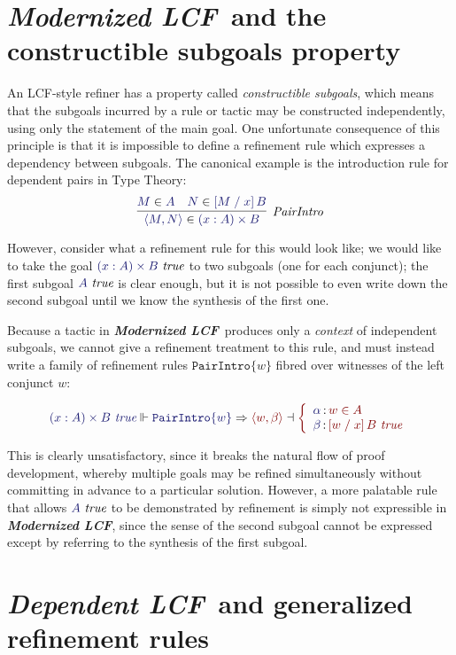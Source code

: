 \documentclass[11pt]{article}
\theoremstyle{definition}
\theoremstyle{remark}
\numberwithin{equation}{section}
\def\IModeColorName{MidnightBlue}
\def\OModeColorName{Maroon}
\newcommand\IMode[1]{{\color{\IModeColorName}{#1}}}
\newcommand\OMode[1]{{\color{\OModeColorName}{#1}}}
\newcommand\OSG[2]{\IMode{#1}\,{\color{Black}:}\,\OMode{#2}}
\newcommand\Refine[4]{\IMode{#1}\Vdash\IMode{#2}\Rightarrow\OMode{#4}\dashv\OMode{#3}}
\newcommand\Member[2]{\IMode{#1}\in\IMode{#2}}
\newcommand\MemberUnmoded[2]{#1\in #2}
\newcommand\IsTrue[1]{\IMode{#1}\ \textit{true}}
\newcommand\IsTrueUnmoded[1]{#1\ \textit{true}}
\newcommand\DPairIntroRule[1]{\mathtt{PairIntro}\{#1\}}
\newcommand\TyDPair[3]{(#2:#1) \times #3}
\newcommand\Tuple[1]{\left\langle#1\right\rangle}
\newcommand\Subst[3]{\left[#1\;/\;#2\right]#3}
\newcommand\ModLCF{\textbf{\emph{Modernized LCF}}}
\newcommand\DepLCF{\textbf{\emph{Dependent LCF}}}
\begin{document}
\section{\ModLCF\ and the constructible subgoals property}

An LCF-style refiner has a property called \emph{constructible subgoals}, which
means that the subgoals incurred by a rule or tactic may be constructed
independently, using only the statement of the main goal. One unfortunate
consequence of this principle is that it is impossible to define a refinement
rule which expresses a dependency between subgoals. The canonical example is
the introduction rule for dependent pairs in Type Theory:
\[
  \infer[\textit{PairIntro}]{
    \Member{\Tuple{M,N}}{\TyDPair{A}{x}{B}}
  }{
    \Member{M}{A} &
    \Member{N}{\Subst{M}{x}{B}}
  }
\]

However, consider what a refinement rule for this would look like; we would
like to take the goal $\IsTrue{\TyDPair{A}{x}{B}}$ to two subgoals (one for
each conjunct); the first subgoal $\IsTrue{A}$ is clear enough, but it is not
possible to even write down the second subgoal until we know the synthesis of
the first one.

Because a tactic in \ModLCF\ produces only a \emph{context} of independent
subgoals, we cannot give a refinement treatment to this rule, and must
instead write a family of refinement rules $\DPairIntroRule{w}$ fibred over
witnesses of the left conjunct $w$:

\[
  \Refine{\IsTrueUnmoded{\TyDPair{A}{x}{B}}}{\DPairIntroRule{w}}{%
    \left\{\begin{array}{l}
      \OSG{\alpha}{\MemberUnmoded{w}{A}}\\
      \OSG{\beta}{\IsTrueUnmoded{\Subst{w}{x}{B}}}
    \end{array}\right.
  }{\Tuple{w,\beta}}
\]

This is clearly unsatisfactory, since it breaks the natural flow of proof
development, whereby multiple goals may be refined simultaneously without
committing in advance to a particular solution. However, a more palatable
rule that allows $\IsTrue{A}$ to be demonstrated by refinement is
simply not expressible in \ModLCF, since the sense of the second subgoal cannot
be expressed except by referring to the synthesis of the first subgoal.

\section{\DepLCF\ and generalized refinement rules}
\end{document}
